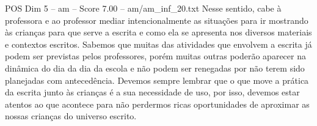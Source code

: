 \begin{textsample}{POS Dim 5 – am – Score 7.00 – am/am\_inf\_20.txt}
Nesse sentido, cabe à professora e ao professor mediar intencionalmente as situações para ir mostrando às crianças para que serve a escrita e como ela se apresenta nos diversos materiais e contextos escritos.
Sabemos que muitas das atividades que envolvem a escrita já podem ser previstas pelos professores, porém muitas outras poderão aparecer na dinâmica do dia da dia da escola e não podem ser renegadas por não terem sido planejadas com antecedência.
Devemos sempre lembrar que o que move a prática da escrita junto às crianças é a sua necessidade de uso, por isso, devemos estar atentos ao que acontece para não perdermos ricas oportunidades de aproximar as nossas crianças do universo escrito.

\end{textsample}
